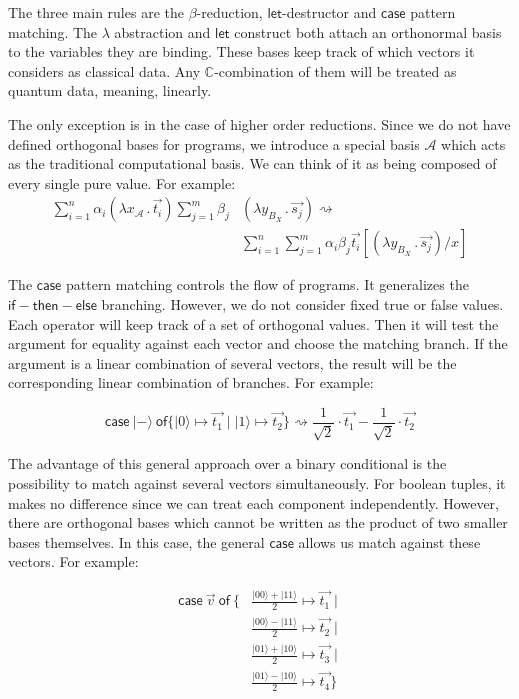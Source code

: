 \documentclass[runningheads,orivec,envcountsame,envcountsect]{llncs}
\newcommand\ket[1]{\ensuremath{|#1\rangle}}
\newcommand\AbsBasis{\ensuremath{\mathcal{A}}}
\def\C{\mathbb{C}}            %
\def\Lam#1#2#3{\lambda#1_{#2}\,{.}\,#3} %
\def\case#1#2#3#4#5{\ensuremath{\mathsf{case}~#1~\mathsf{of} \{#2\mapsto #4 \mid #3\mapsto #5\}}}
\def\lraneq{\rightsquigarrow}
\newcommand\basis[1]{\ensuremath{B_{ #1 }}}
\begin{document}
The three main rules are the $\beta$-reduction, $\mathsf{let}$-destructor and $\mathsf{case}$ pattern matching. The $\lambda$ abstraction and $\mathsf{let}$ construct both attach an orthonormal basis to the variables they are binding. These bases keep track of which vectors it considers as classical data. Any $\C$-combination of them will be treated as quantum data, meaning, linearly. 

The only exception is in the case of higher order reductions. Since we do not have defined orthogonal bases for programs, we introduce a special basis $\AbsBasis$ which acts as the traditional computational basis. We can think of it as being composed of every single pure value. For example:
\begin{align*}
  \sum_{i=1}^{n}\alpha_i(\Lam{x}{\AbsBasis}{\vec{t_i}}) \sum_{j=1}^{m}\beta_j&(\Lam{y}{\basis{X}}{\vec{s_j}}) \lraneq\\
  &\sum_{i=1}^n\sum_{j=1}^{m}\alpha_i\beta_j \vec{t_i}[(\Lam{y}{\basis{X}}{\vec{s_j}})/x]
\end{align*}

The $\mathsf{case}$ pattern matching controls the flow of programs. It generalizes the $\mathsf{if-then-else}$ branching. However, we do not consider fixed true or false values. Each operator will keep track of a set of orthogonal values. Then it will test the argument for equality against each vector and choose the matching branch. If the argument is a linear combination of several vectors, the result will be the corresponding linear combination of branches. For example:

\[
  \case{\ket{-}}{\ket{0}}{\ket{1}}{\vec{t_1}}{\vec{t_2}} \lraneq
  \frac{1}{\sqrt{2}}\cdot\vec{t_1} - \frac{1}{\sqrt{2}}\cdot\vec{t_2}
\]

The advantage of this general approach over a binary conditional is the possibility to match against several vectors simultaneously. For boolean tuples, it makes no difference since we can treat each component independently. However, there are orthogonal bases which cannot be written as the product of two smaller bases themselves. In this case, the general $\mathsf{case}$ allows us match against these vectors. For example:

\begin{align*}
  \mathsf{case}\ \vec{v}\ \mathsf{of}\ \{ 
  &\frac{\ket{00} + \ket{11}}{2}\mapsto \vec{t_1} \mid\\
  &\frac{\ket{00} - \ket{11}}{2}\mapsto \vec{t_2} \mid\\
  &\frac{\ket{01} + \ket{10}}{2}\mapsto \vec{t_3} \mid\\
  &\frac{\ket{01} - \ket{10}}{2}\mapsto \vec{t_4} \}
\end{align*}
\end{document}

